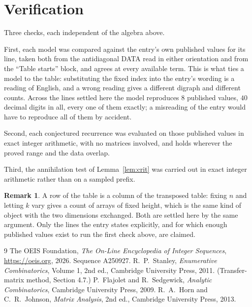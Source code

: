 \documentclass[11pt,a4paper]{article}
\theoremstyle{plain}
\theoremstyle{definition}
\newtheorem{remark}[theorem]{Remark}
\begin{document}
\section{Verification}

Three checks, each independent of the algebra above.

First, each model was compared against the entry's own published values for its line, taken
both from the antidiagonal DATA read in either orientation and from the ``Table starts''
block, and agrees at every available term. This is what ties a model to the table:
substituting the fixed index into the entry's wording is a reading of English, and a wrong
reading gives a different digraph and different counts. Across the lines settled here the
model reproduces $8$ published values, $40$ decimal digits in all, every one of
them exactly; a misreading of the entry would have to reproduce all of them by accident.

Second, each conjectured recurrence was evaluated on those published values in exact
integer arithmetic, with no matrices involved, and holds wherever the proved range and the
data overlap.

Third, the annihilation test of Lemma~\ref{lem:crit} was carried out in exact integer
arithmetic rather than on a sampled prefix.

\begin{remark}
A row of the table is a column of the transposed table: fixing $n$ and letting $k$ vary gives a
count of arrays of fixed height, which is the same kind of object with the two dimensions
exchanged. Both are settled here by the same argument. Only the lines the entry states
explicitly, and for which enough published values exist to run the first check above, are
claimed.
\end{remark}

\begin{thebibliography}{9}
 The OEIS Foundation, \emph{The On-Line Encyclopedia of Integer
Sequences}, \url{https://oeis.org}, 2026. Sequence A250927.
 R.~P.~Stanley, \emph{Enumerative Combinatorics}, Volume 1, 2nd ed.,
Cambridge University Press, 2011. (Transfer-matrix method, Section 4.7.)
 P.~Flajolet and R.~Sedgewick, \emph{Analytic Combinatorics}, Cambridge
University Press, 2009.
 R.~A.~Horn and C.~R.~Johnson, \emph{Matrix Analysis}, 2nd ed., Cambridge
University Press, 2013.
\end{thebibliography}
\end{document}
